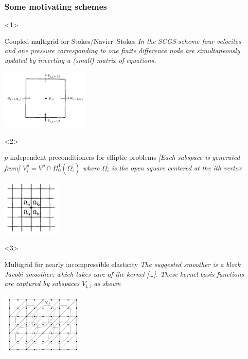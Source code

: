 \documentclass[presentation,aspectratio=43, 10pt]{beamer}
\begin{document}
\begin{frame}[t]
  \frametitle{Some motivating schemes}
  \begin{onlyenv}<1>
    \begin{block}{Coupled multigrid for Stokes/Navier--Stokes}
      \emph{In the SCGS scheme four velocites and one pressure
      corresponding to one finite difference node are simultaneously
      updated by inverting a (small) matrix of equations.}

      \begin{center}
        \includegraphics[height=3cm]{vanka}
      \end{center}
      {\hfill \textcite{Vanka:1986}}
    \end{block}
  \end{onlyenv}
  \begin{onlyenv}<2>
    \begin{block}{$p$-independent preconditioners for elliptic problems}
      \emph{[Each subspace is generated from]
      $V_i^p = V^p \cap H^1_0(\Omega_i^{'})$ where $\Omega_i^{'}$ is the open square
      centered at the ith vertex}
      \begin{center}
        \includegraphics[width=3cm]{pavarino}
      \end{center}
      {\hfill \textcite{Pavarino:1993}}
    \end{block}
  \end{onlyenv}

  \begin{onlyenv}<3>
    \begin{block}{Multigrid for nearly incompressible elasticity}
      \emph{The suggested smoother is a block Jacobi smoother, which takes
      care of the kernel [\dots]. These kernel basis functions are
      captured by subspaces $V_{l,i}$ as shown}
      \begin{center}
        \includegraphics[height=3.25cm]{schoeberl}
      \end{center}
      {\hfill\textcite{Schoeberl:1999}}
    \end{block}
  \end{onlyenv}


\end{frame}
\end{document}
